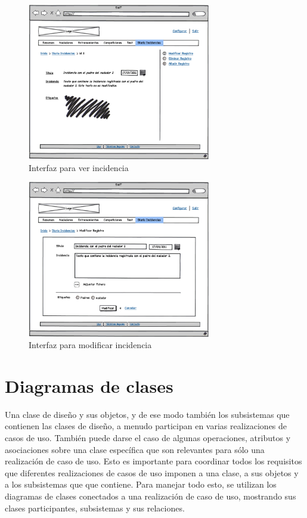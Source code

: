   		\begin{figure}[H]
  		  \centering
  		    \includegraphics[width=8cm]{./eps/p_interfaz/24_Diario_show.eps}
  		  \caption{Interfaz para ver incidencia}
  		  \label{fig:interfaz_incidencias_show}
  		\end{figure}

  		\begin{figure}[H]
  		  \centering
  		    \includegraphics[width=8cm]{./eps/p_interfaz/25_Diario_modif.eps}
  		  \caption{Interfaz para modificar incidencia}
  		  \label{fig:interfaz_incidencias_modif}
  		\end{figure}
  
	\section{Diagramas de clases} %
		\label{sec:diagramas_de_clases}
		
		Una clase de diseño y sus objetos, y de ese modo también los subsistemas que contienen las clases de diseño, a menudo participan en varias realizaciones de casos de uso. También puede darse el caso de algunas operaciones, atributos y asociaciones sobre una clase específica que son relevantes para sólo una realización de caso de uso. Esto es importante para coordinar todos los requisitos que diferentes realizaciones de casos de uso imponen a una clase, a sus objetos y a los subsistemas que que contiene. Para manejar todo esto, se utilizan los diagramas de clases conectados a una realización de caso de uso, mostrando sus clases participantes, subsistemas y sus relaciones. 
		
